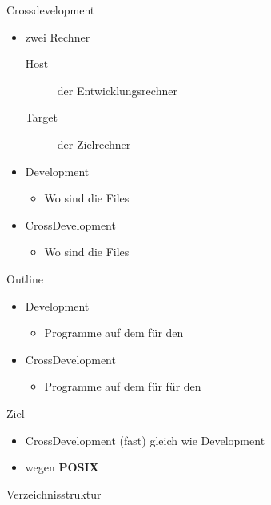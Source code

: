 \begin{frame}{Crossdevelopment}
 \begin{itemize}
  \item zwei Rechner
  \begin{description}
   \item[Host] der Entwicklungsrechner
   \item[Target] \targetS der Zielrechner
  \end{description}
  \item Development
  \begin{itemize}
   \item Wo sind die Files
  \end{itemize}
  \item CrossDevelopment
  \begin{itemize}
   \item Wo sind die Files
  \end{itemize}
 \end{itemize}
\end{frame}

\begin{frame}{Outline}
 \begin{itemize}
  \item Development
  \begin{itemize}
   \item Programme auf dem \host für den \host
  \end{itemize}
  \item CrossDevelopment
  \begin{itemize}
   \item Programme auf dem \host für für den \target
  \end{itemize}
 \end{itemize}
\end{frame}

\begin{frame}{Ziel}
 \begin{itemize}
  \item CrossDevelopment (fast) gleich wie Development
  \item wegen {\bf POSIX}
 \end{itemize}
\end{frame}

\begin{frame}{Verzeichnisstruktur}
\end{frame}

